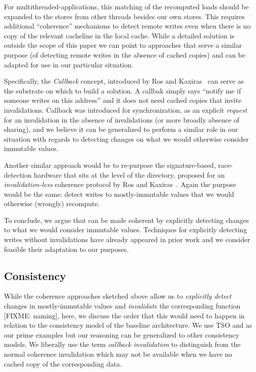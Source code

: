 For multithreaded-applications, this matching of the recomputed loads should be expanded to the stores from other threads besides our own stores. This requires additional ``coherence'' mechanisms to detect remote writes even when there is no copy of the relevant cacheline in the local cache. While a detailed solution is outside the scope of this paper we can point to approaches that serve a similar purpose (of detecting remote writes in the absence of cached copies) and can be adapted for use in our particular situation. 

Specifically, the \emph{Callback} concept, introduced by Ros and Kaxiras~\cite{aros-isca15} can serve as the substrate on which to build a solution. A callbak simply says ``notify me if someone writes on this address'' and it does not need cached copies that invite invalidations. Callback was introduced for synchronization, as an explicit \emph{request} for an invalidation in the absence of invalidations (or more broadly absence of sharing), and we believe it can be generalized to perform a similar role in our situation with regards to detecting changes on what we would otherwise consider immutable values. 

Another similar approach would be to re-purpose the signature-based, race-detection hardware that sits at the level of the directory, proposed for an \emph{invalidation-less} coherence protocol by Ros and Kaxiras~\cite{aros-micro16}. Again the purpose would be the same: detect writes to mostly-immutable values that we would otherwise (wrongly) recompute.

To conclude, we argue that {\recomp} can be made coherent by explicitly detecting changes to what we would consider immutable values. Techniques for explicitly detecting writes without invalidations have already appeared in prior work and we consider feasible their adaptation to our purposes.

\subsection{Consistency}
\label{sec:consistency}
While the coherence approaches sketched above allow us to \emph{explicitly detect} changes in mostly-immutable values and \emph{invalidate} the corresponding {\recomp} function {\color{red} [FIXME: naming]}, here, we discuss the order that this would need to happen in relation to the consistency model of the baseline architecture.
We use TSO and {\rc} as our prime examples but our reasoning can be generalized to other consistency models. We liberally use the term \emph{callback invalidation} to distinguish from the normal coherence invalidation which may not be available when we have no cached copy of the corresponding data.

